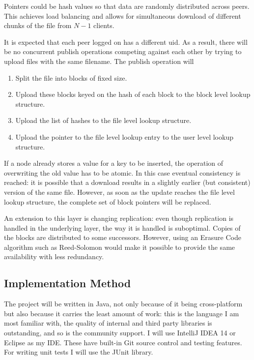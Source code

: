 \documentclass[12pt]{article}
\begin{document}
Pointers could be hash values so that data are randomly distributed across peers. This achieves load balancing and allows for simultaneous download of different chunks of the file from $N-1$ clients.

It is expected that each peer logged on has a different \gls{uid}. As a result, there will be no concurrent publish operations competing against each other by trying to upload files with the same filename. The publish operation will 

\begin{enumerate}
\item{Split the file into blocks of fixed size.}
\item{Upload these blocks keyed on the hash of each block to the block level lookup structure.}
\item{Upload the list of hashes to the file level lookup structure.}
\item{Upload the pointer to the file level lookup entry to the user level lookup structure.}
\end{enumerate}

If a node already stores a value for a key to be inserted, the operation of overwriting the old value has to be atomic. In this case eventual consistency is reached: it is possible that a download results in a slightly earlier (but consistent) version of the same file. However, as soon as the update reaches the file level lookup structure, the complete set of block pointers will be replaced.

An extension to this layer is changing replication: even though replication is handled in the underlying layer, the way it is handled is suboptimal. Copies of the blocks are distributed to some successors. However, using an Erasure Code algorithm such as Reed-Solomon would make it possible to provide the same availability with less redundancy.

\subsection{Implementation Method}

The project will be written in Java, not only because of it being cross-platform but also because it carries the least amount of work: this is the language I am most familiar with, the quality of internal and third party libraries is outstanding, and so is the community support. I will use IntelliJ IDEA 14 or Eclipse as my IDE. These have built-in Git source control and testing features. For writing unit tests I will use the JUnit library.
\end{document}
